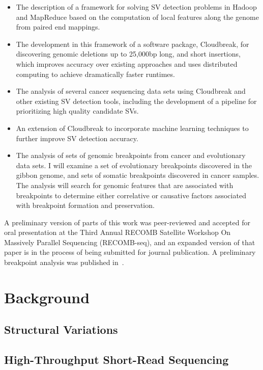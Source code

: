 \documentclass [11pt] {report}
\begin{document}
\begin{itemize}
 \item The description of a framework for solving SV detection problems in Hadoop and MapReduce based on the computation of local features along the genome from paired end mappings.
 \item The development in this framework of a software package, Cloudbreak, for discovering genomic deletions up to 25,000bp long, and short insertions, which improves accuracy over existing approaches and uses distributed computing to achieve dramatically faster runtimes.
 \item The analysis of several cancer sequencing data sets using Cloudbreak and other existing SV detection tools, including the development of a pipeline for prioritizing high quality candidate SVs.
 \item An extension of Cloudbreak to incorporate machine learning techniques to further improve SV detection accuracy.
 \item The analysis of sets of genomic breakpoints from cancer and evolutionary data sets. I will examine a set of evolutionary breakpoints discovered in the gibbon genome, and sets of somatic breakpoints discovered in cancer samples. The analysis will search for genomic features that are associated with breakpoints to determine either correlative or causative factors associated with breakpoint formation and preservation.
\end{itemize}

A preliminary version of parts of this work was peer-reviewed and accepted for oral presentation at the Third Annual RECOMB Satellite Workshop On Massively Parallel Sequencing (RECOMB-seq), and an expanded version of that paper is in the process of being submitted for journal publication. A preliminary breakpoint analysis was published in~\cite{Capozzi:2012bb}.

\chapter{Background}

\section{Structural Variations}

\section{High-Throughput Short-Read Sequencing}
\end{document}
